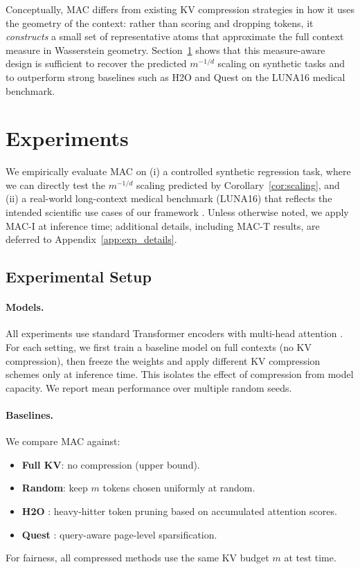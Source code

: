 \documentclass{article}
\theoremstyle{plain}
\theoremstyle{definition}
\theoremstyle{remark}
\begin{document}
Conceptually, MAC differs from existing KV compression strategies in how it uses the
geometry of the context: rather than scoring and dropping tokens, it \emph{constructs}
a small set of representative atoms that approximate the full context measure in
Wasserstein geometry. Section~\ref{sec:exp} shows that this measure-aware design is
sufficient to recover the predicted $m^{-1/d}$ scaling on synthetic tasks and to
outperform strong baselines such as H2O and Quest on the LUNA16 medical benchmark.

\section{Experiments}
\label{sec:exp}

We empirically evaluate MAC on (i) a controlled synthetic regression task, where we can
directly test the $m^{-1/d}$ scaling predicted by Corollary~\ref{cor:scaling}, and
(ii) a real-world long-context medical benchmark (LUNA16) that reflects the intended
scientific use cases of our framework \citep{moor2023foundation,setio2017validation}.
Unless otherwise noted, we apply MAC-I at inference time; additional details, including
MAC-T results, are deferred to Appendix~\ref{app:exp_details}.

\subsection{Experimental Setup}
\label{sec:exp_setup}

\paragraph{Models.}
All experiments use standard Transformer encoders with multi-head attention
\citep{vaswani2017attention}. For each setting, we first train a baseline model on full
contexts (no KV compression), then freeze the weights and apply different KV compression
schemes only at inference time. This isolates the effect of compression from model
capacity. We report mean performance over multiple random seeds.

\paragraph{Baselines.}
We compare MAC against:
\begin{itemize}[leftmargin=*,noitemsep,topsep=1pt]
    \item \textbf{Full KV}: no compression (upper bound).
    \item \textbf{Random}: keep $m$ tokens chosen uniformly at random.
    \item \textbf{H2O} \citep{zhang2024h2o}: heavy-hitter token pruning based on accumulated
    attention scores.
    \item \textbf{Quest} \citep{tang2024quest}: query-aware page-level sparsification.
\end{itemize}
For fairness, all compressed methods use the same KV budget $m$ at test time.
\end{document}
